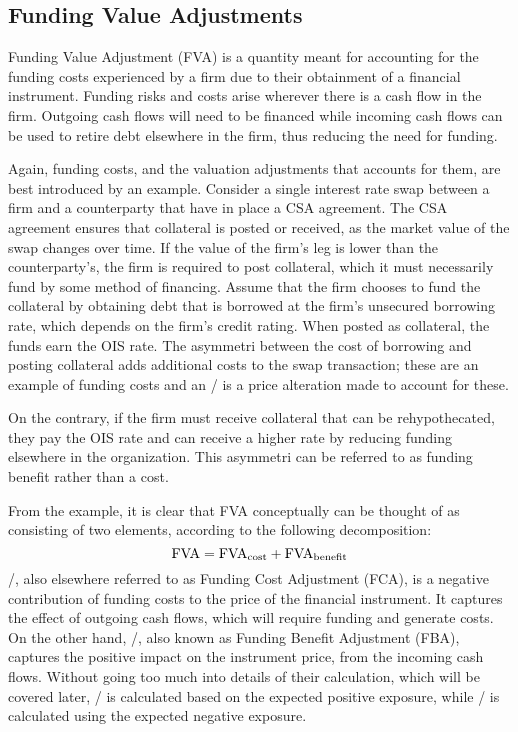 \documentclass[main.tex]{subfiles}
\begin{document}
    \subsection{Funding Value Adjustments}
        Funding Value Adjustment (FVA) is a quantity meant for accounting for the funding costs 
        experienced by a firm due to their obtainment of a financial instrument.
        Funding risks and costs arise wherever there is a cash flow in the firm. 
        Outgoing cash flows will need to be financed while incoming cash flows
        can be used to retire debt elsewhere in the firm, thus reducing the need for funding.

        Again, funding costs, and the valuation adjustments that accounts for them,
        are best introduced by an example.
        Consider a single interest rate swap between a firm and a counterparty that have in place a CSA agreement.
        The CSA agreement ensures that collateral is posted or received,
        as the market value of the swap changes over time.
        If the value of the firm's leg is lower than the counterparty's,
        the firm is required to post collateral, 
        which it must necessarily fund by some method of financing.
        Assume that the firm chooses to fund the collateral by obtaining debt
        that is borrowed at the firm's unsecured borrowing rate, which depends on the firm's credit rating.
        When posted as collateral, the funds earn the OIS rate.
        The asymmetri between the cost of borrowing and posting collateral
        adds additional costs to the swap transaction; 
        these are an example of funding costs and an \FVA/ is a price alteration made to account for these.

        On the contrary, if the firm must receive collateral that can be rehypothecated,
        they pay the OIS rate and can receive a higher rate
        by reducing funding elsewhere in the organization.
        This asymmetri can be referred to as funding benefit rather than a cost.
        
        From the example, it is clear that FVA conceptually can be thought of 
        as consisting of two elements, according to the following decomposition:
        \begin{equation}
            \FVA/ = \FCA/ + \FBA/
        \end{equation}
        \FCA/, also elsewhere referred to as Funding Cost Adjustment (FCA), 
        is a negative contribution of funding costs to the price of the financial instrument.
        It captures the effect of outgoing cash flows, which will require funding and generate costs.
        On the other hand, \FBA/, also known as Funding Benefit Adjustment (FBA), 
        captures the positive impact on the instrument price, from the incoming cash flows.
        Without going too much into details of their calculation, which will be covered later,
        \FCA/ is calculated based on the expected positive exposure, 
        while \FBA/ is calculated using the expected negative exposure. 
\end{document}
